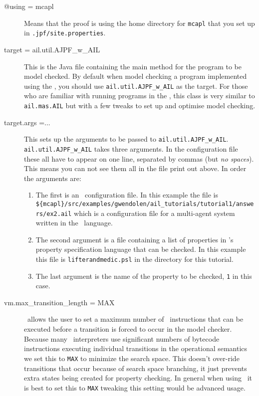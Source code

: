 \documentclass[a4]{article}
\begin{document}
\begin{sloppypar}
\begin{description}
\item[@using = mcapl] Means that the proof is using the home directory for \texttt{mcapl} that you set up in \texttt{.jpf/site.properties}.
\item[target = ail.util.AJPF\_w\_AIL] This is the Java file containing the main method for the program to be model checked.  By default when model checking a program implemented using the \ail, you should use \texttt{ail.util.AJPF\_w\_AIL} as the target.  For those who are familiar with running programs in the \ail, this class is very similar to \texttt{ail.mas.AIL} but with a few tweaks to set up and optimise model checking.
\item[target.args =...] This sets up the arguments to be passed to \texttt{ail.util.AJPF\_w\_AIL}.  \texttt{ail.util.AJPF\_w\_AIL} takes three arguments.  In the configuration file these all have to appear on one line, separated by commas (but \emph{no spaces}).  This means you can not see them all in the file print out above.  In order the arguments are:
\begin{enumerate}
\item The first is an \ail\ configuration file.  In this example the file is \texttt{\$\{mcapl\}/src/examples/gwendolen/ail\_tutorials/tutorial1/answers/ex2.ail} which is a configuration file for a multi-agent system written in the \gwendolen\ language.
\item The second argument is a file containing a list of properties in \ajpf's property specification language that can be checked.  In this example this file is \texttt{lifterandmedic.psl} in the directory for this tutorial.
\item The last argument is the name of the property to be checked, \texttt{1} in this case.
\end{enumerate}
\item[vm.max\_transition\_length = MAX] \jpf\ allows the user to set a maximum number of \java\ instructions that can be executed before a transition is forced to occur in the model checker.  Because many \ail\ interpreters use significant numbers of bytecode instructions executing individual transitions in the operational semantics we set this to \texttt{MAX} to minimize the search space.  This doesn't over-ride transitions that occur because of search space branching, it just prevents extra states being created for property checking.  In general when using \ajpf\ it is best to set this to \texttt{MAX} tweaking this setting would be advanced usage.
\end{description}
\end{sloppypar}
\end{document}
